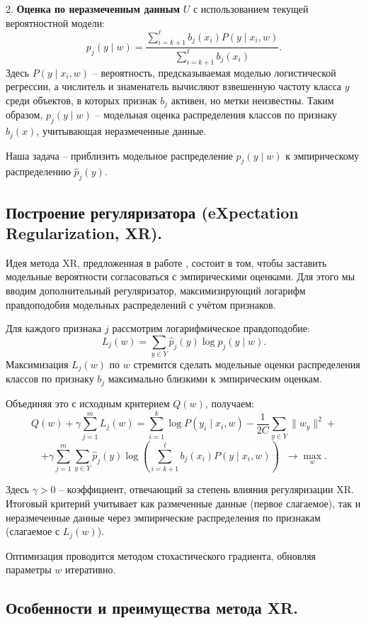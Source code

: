 2. \textbf{Оценка по неразмеченным данным} $U$ с использованием текущей вероятностной модели:
\[
p_j(y \mid w) = \frac{\sum_{i=k+1}^{\ell} b_j(x_i) P(y \mid x_i, w)}{\sum_{i=k+1}^{\ell} b_j(x_i)}.
\]
Здесь $P(y \mid x_i, w)$ – вероятность, предсказываемая моделью логистической регрессии, а числитель и знаменатель вычисляют взвешенную частоту класса $y$ среди объектов, в которых признак $b_j$ активен, но метки неизвестны. Таким образом, $p_j(y \mid w)$ – модельная оценка распределения классов по признаку $b_j(x)$, учитывающая неразмеченные данные.

Наша задача – приблизить модельное распределение $p_j(y \mid w)$ к эмпирическому распределению $\hat{p}_j(y)$.

\subsection{Построение регуляризатора (eXpectation Regularization, XR).}

Идея метода XR, предложенная в работе \cite{mann2007simple}, состоит в том, чтобы заставить модельные вероятности согласоваться с эмпирическими оценками. Для этого мы вводим дополнительный регуляризатор, максимизирующий логарифм правдоподобия модельных распределений с учётом признаков.

Для каждого признака $j$ рассмотрим логарифмическое правдоподобие:
\[
L_j(w) = \sum_{y \in Y} \hat{p}_j(y) \log p_j(y \mid w).
\]
Максимизация $L_j(w)$ по $w$ стремится сделать модельные оценки распределения классов по признаку $b_j$ максимально близкими к эмпирическим оценкам. 

Объединяя это с исходным критерием $Q(w)$, получаем:
\[
Q(w) + \gamma \sum_{j=1}^m L_j(w) = \sum_{i=1}^k \log P(y_i \mid x_i, w) 
- \frac{1}{2C}\sum_{y \in Y}\|w_y\|^2 +
\]
\[
+ \gamma \sum_{j=1}^m \sum_{y \in Y} \hat{p}_j(y)\log\left(\sum_{i=k+1}^{\ell} b_j(x_i)P(y \mid x_i, w)\right) \;\; \to \max_w.
\]

Здесь $\gamma > 0$ – коэффициент, отвечающий за степень влияния регуляризации XR. Итоговый критерий учитывает как размеченные данные (первое слагаемое), так и неразмеченные данные через эмпирические распределения по признакам (слагаемое с $L_j(w)$).

Оптимизация проводится методом стохастического градиента, обновляя параметры $w$ итеративно.

\subsection{Особенности и преимущества метода XR.}

